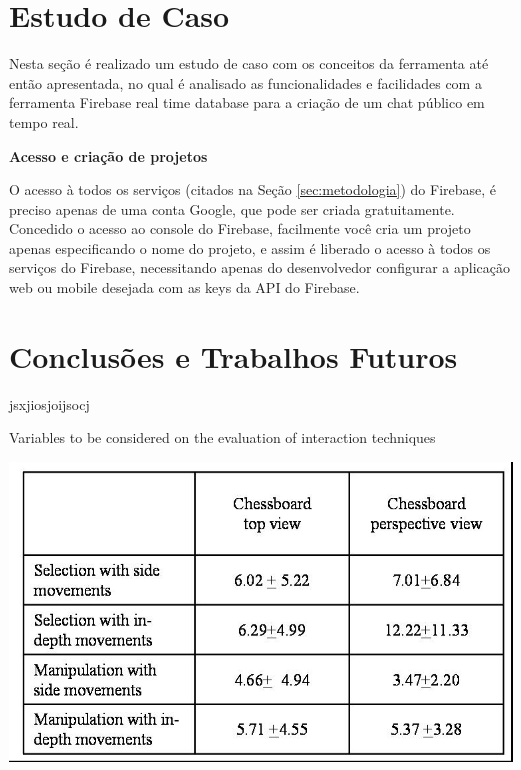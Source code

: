 \documentclass[12pt]{article}
\begin{document}
\section{Estudo de Caso}

Nesta seção é realizado um estudo de caso com os conceitos da ferramenta até então apresentada, no qual é analisado as funcionalidades e facilidades com a ferramenta Firebase real time database para a criação de um chat público em tempo real.

\textbf{Acesso e criação de projetos}

O acesso à todos os serviços (citados na Seção \ref{sec:metodologia}) do Firebase, é preciso apenas de uma conta Google, que pode ser criada gratuitamente. Concedido o acesso ao console do Firebase, facilmente você cria um projeto apenas especificando o nome do projeto, e assim é liberado o acesso à todos os serviços do Firebase, necessitando apenas do desenvolvedor configurar a aplicação web ou mobile desejada com as keys da API do Firebase.

\section{Conclusões e Trabalhos Futuros}

jsxjiosjoijsocj

\begin{table}[ht]
\centering
\caption{Variables to be considered on the evaluation of interaction
  techniques}
\label{tab:exTable1}
\includegraphics[width=.7\textwidth]{table.jpg}
\end{table}



\end{document}
